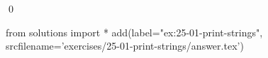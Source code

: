 
\begin{ex}
  \label{ex:25-01-print-strings}
  
  \qed
\end{ex}
\begin{python0}
from solutions import *
add(label="ex:25-01-print-strings",
    srcfilename='exercises/25-01-print-strings/answer.tex')
\end{python0}

